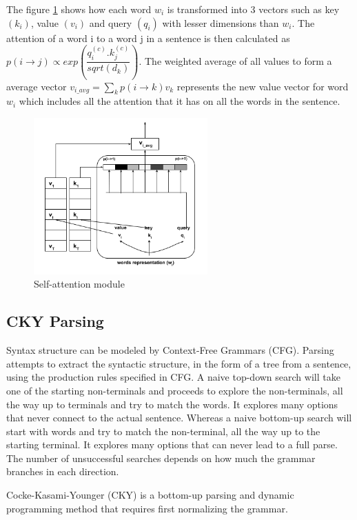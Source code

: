 \documentclass[a4paper, 11pt]{article}
\begin{document}
The figure \ref{fig:single self attention head} shows how each word $w_i$ is transformed into 3 vectors such as key $(k_i)$,  value $(v_i)$ and query $(q_i)$ with lesser dimensions than $w_i$. The attention of a word i to a word j in a sentence is then calculated as 
$ p(i\rightarrow{}j) \propto exp(\dfrac{q^{(c)}_i.k^{(c)}_j}{sqrt(d_k)}) $. The weighted average of all values to form a average vector $v_{i\_avg} = \sum_{k}p(i\rightarrow{}k)v_k$ represents the new value vector for word $w_i$ which includes all the attention that it has on all the words in the sentence. 

\begin{figure}[H]
    \centering
    \includegraphics[width=\textwidth,height=6cm,keepaspectratio=true]
    {self-attention.png}
    \caption{
        Self-attention module
    }
    \label{fig:single self attention head}
\end{figure}


\subsection{CKY Parsing}


Syntax structure can be modeled by Context-Free Grammars (CFG). Parsing attempts to extract the syntactic structure, in the form of a tree from a sentence, using the production rules specified in CFG.  A naive top-down search will take one of the starting non-terminals and proceeds to explore the non-terminals, all the way up to terminals and try to match the words. It explores many options that never connect to the actual sentence. Whereas a naive bottom-up search will start with words and try to match the non-terminal, all the way up to the starting terminal. It explores many options that can never lead to a full parse. The number of unsuccessful searches depends on how much the grammar branches in each direction.

Cocke-Kasami-Younger (CKY) \parencite{YOUNGER1967189} is a bottom-up parsing and dynamic programming method that requires first normalizing the grammar. 
\end{document}
